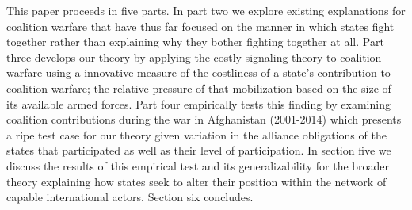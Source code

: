 \documentclass[12pt,letterpaper]{article}
\begin{document}
	This paper proceeds in five parts. In part two we explore existing explanations for coalition warfare that have thus far focused on the manner in which states fight together rather than explaining why they bother fighting together at all. Part three develops our theory by applying the costly signaling theory to coalition warfare using a innovative measure of the costliness of a state's contribution to coalition warfare; the relative pressure of that mobilization based on the size of its available armed forces. Part four empirically tests this finding by examining coalition contributions during the war in Afghanistan (2001-2014) which presents a ripe test case for our theory given variation in the alliance obligations of the states that participated as well as their level of participation. In section five we discuss the results of this empirical test and its generalizability for the broader theory explaining how states seek to alter their position within the network of capable international actors. Section six concludes.
\end{document}
